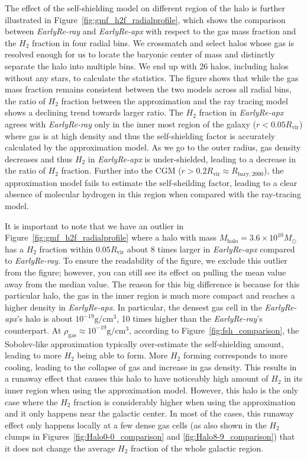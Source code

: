 \documentclass[linenumbers, twocolumn]{aastex631}
\begin{document}
The effect of the self-shielding model on different region of the halo is further illustrated in Figure~\ref{fig:gmf_h2f_radialprofile}, which shows the comparison between \textit{EarlyRe-ray} and \textit{EarlyRe-apx} with respect to the gas mass fraction and the $H_{2}$ fraction in four radial bins. We crossmatch and select halos whose gas is resolved enough for us to locate the baryonic center of mass and distinctly separate the halo into multiple bins. We end up with 26 halos, including halos without any stars, to calculate the statistics. The figure shows that while the gas mass fraction remains consistent between the two models across all radial bins, the ratio of $H_{2}$ fraction between the approximation and the ray tracing model shows a declining trend towards larger ratio. The $H_{2}$ fraction in \textit{EarlyRe-apx} agrees with \textit{EarlyRe-ray} only in the inner most region of the galaxy ($r < 0.05R_{\mathrm{vir}}$) where gas is at high density and thus the self-shielding factor is accurately calculated by the approximation model. As we go to the outer radius, gas density decreases and thus $H_{2}$ in \textit{EarlyRe-apx} is under-shielded, leading to a decrease in the ratio of $H_{2}$ fraction. Further into the CGM ($r > 0.2R_{\mathrm{vir}} \approx R_{\mathrm{bary},2000}$), the approximation model fails to estimate the self-sheilding factor, leading to a clear absence of molecular hydrogen in this region when compared with the ray-tracing model. 

It is important to note that we have an outlier in Figure~\ref{fig:gmf_h2f_radialprofile} where a halo with mass $M_{\mathrm{halo}} = 3.6\times10^{10} M_\odot$ has a $H_{2}$ fraction within $0.05R_{\mathrm{vir}}$ about 8 times larger in \textit{EarlyRe-apx} compared to \textit{EarlyRe-ray}. To ensure the readability of the figure, we exclude this outlier from the figure; however, you can still see its effect on pulling the mean value away from the median value. The reason for this big difference is because for this particular halo, the gas in the inner region is much more compact and reaches a higher density in \textit{EarlyRe-apx}. In particular, the densest gas cell in the \textit{EarlyRe-apx}'s halo is about $10^{-19} \mathrm{g}/\mathrm{cm}^{3}$, 10 times higher than the \textit{EarlyRe-ray}'s counterpart. At $\rho_\mathrm{gas} \approx 10^{-19} \mathrm{g}/\mathrm{cm}^{3}$, according to Figure~\ref{fig:fsh_comparison}, the Sobolev-like approximation typically over-estimate the self-shielding amount, leading to more $H_{2}$ being able to form. More $H_{2}$ forming corresponds to more cooling, leading to the collapse of gas and increase in gas density. This results in a runaway effect that causes this halo to have noticeably high amount of $H_{2}$ in its inner region when using the approximation model. However, this halo is the only case where the $H_{2}$ fraction is considerably higher when using the approximation and it only happens near the galactic center. In most of the cases, this runaway effect only happens locally at a few dense gas cells (as also shown in the $H_{2}$ clumps in Figures~\ref{fig:Halo0-0_comparison} and \ref{fig:Halo8-9_comparison}) that it does not change the average $H_{2}$ fraction of the whole galactic region. 
\end{document}
